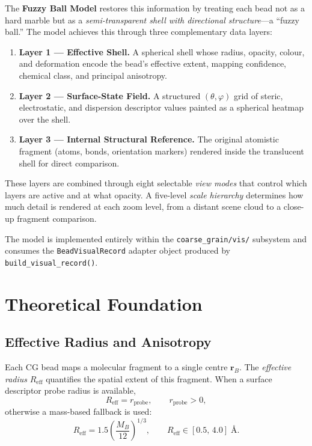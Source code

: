 \documentclass[12pt, a4paper, oneside]{article}
\newcommand{\file}[1]{\texttt{#1}}
\newcommand{\type}[1]{\texttt{#1}}
\newcommand{\Ang}{\text{\AA}}
\newcommand{\Rvec}{\bm{r}}
\begin{document}
The \textbf{Fuzzy Ball Model} restores this information by treating
each bead not as a hard marble but as a \emph{semi-transparent shell
with directional structure}---a ``fuzzy ball.''  The model achieves
this through three complementary data layers:

\begin{enumerate}
  \item \textbf{Layer 1 --- Effective Shell.}  A spherical shell whose
        radius, opacity, colour, and deformation encode the bead's
        effective extent, mapping confidence, chemical class, and
        principal anisotropy.
  \item \textbf{Layer 2 --- Surface-State Field.}  A structured
        $(\theta, \varphi)$ grid of steric, electrostatic, and
        dispersion descriptor values painted as a spherical heatmap
        over the shell.
  \item \textbf{Layer 3 --- Internal Structural Reference.}  The
        original atomistic fragment (atoms, bonds, orientation markers)
        rendered inside the translucent shell for direct comparison.
\end{enumerate}

These layers are combined through eight selectable \emph{view modes}
that control which layers are active and at what opacity.  A five-level
\emph{scale hierarchy} determines how much detail is rendered at each
zoom level, from a distant scene cloud to a close-up fragment comparison.

The model is implemented entirely within the
\file{coarse\_grain/vis/} subsystem and consumes the
\type{BeadVisualRecord} adapter object produced by
\texttt{build\_visual\_record()}.

\section{Theoretical Foundation}

\subsection{Effective Radius and Anisotropy}

Each CG bead maps a molecular fragment to a single centre $\Rvec_B$.
The \emph{effective radius} $R_{\text{eff}}$ quantifies the spatial
extent of this fragment.  When a surface descriptor probe radius is
available,
\begin{equation}
  R_{\text{eff}} = r_{\text{probe}}, \qquad r_{\text{probe}} > 0,
  \label{eq:reff_probe}
\end{equation}
otherwise a mass-based fallback is used:
\begin{equation}
  R_{\text{eff}} = 1.5 \left(\frac{M_B}{12}\right)^{1/3}, \qquad
  R_{\text{eff}} \in [0.5, \, 4.0] \;\Ang.
  \label{eq:reff_mass}
\end{equation}
\end{document}
